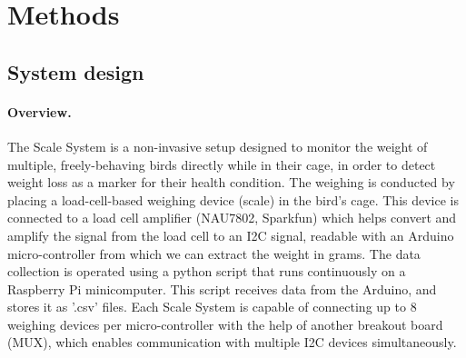 \documentclass{article}
\begin{document}
\section{Methods} \label{sec:methods}

\subsection{System design}

\paragraph{Overview.} The Scale System is a non-invasive setup designed to monitor the weight of multiple, freely-behaving birds directly while in their cage, in order to detect weight loss as a marker for their health condition. The weighing is conducted by placing a load-cell-based weighing device (scale) in the bird's cage. This device is connected to a load cell amplifier (NAU7802, Sparkfun) which helps convert and amplify the signal from the load cell to an I2C signal, readable with an Arduino micro-controller from which we can extract the weight in grams. The data collection is operated using a python script that runs continuously on a Raspberry Pi minicomputer. This script receives data from the Arduino, and stores it as '.csv' files. Each Scale System is capable of connecting up to 8 weighing devices per micro-controller with the help of another breakout board (MUX), which enables communication with multiple I2C devices simultaneously.
\end{document}
